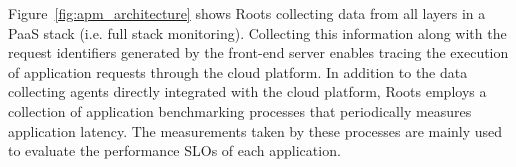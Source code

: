 Figure~\ref{fig:apm_architecture} shows Roots collecting data from all
layers in a PaaS stack (i.e. full stack monitoring). 
%
%
Collecting this information along with the request identifiers generated by the
front-end server
enables tracing the execution of application requests through the cloud platform. In addition
to the data collecting agents directly integrated with the cloud platform, Roots employs
a collection of application benchmarking processes that periodically measures
application latency. The measurements taken by these processes are mainly used to
evaluate the performance SLOs of each application.

